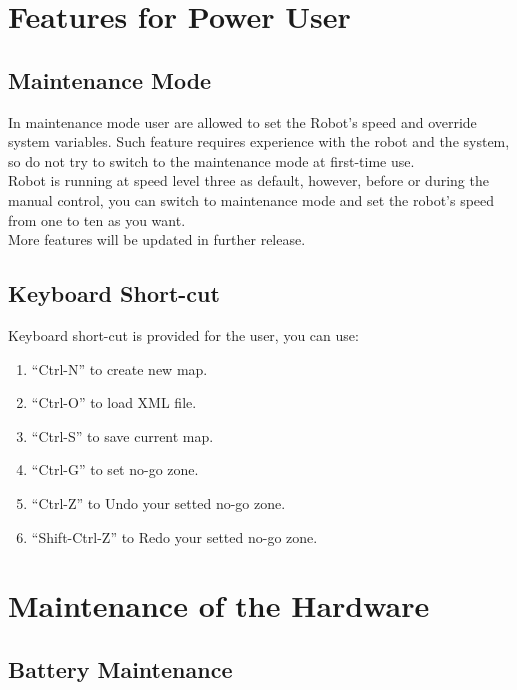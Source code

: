 \documentclass[11pt, a4paper]{report}
\begin{document}
\chapter{Features for Power User} %
\label{cha:features_for_power_user}

\section{Maintenance Mode} %
\label{sec:maintance_mode}
In maintenance mode user are allowed to set the Robot's speed and override system variables. Such feature requires experience with the robot and the system, so do not try to switch to the maintenance mode at first-time use.\\
Robot is running at speed level three as default, however, before or during the manual control, you can switch to maintenance mode and set the robot's speed from one to ten as you want.\\
More features will be updated in further release.\\

\section{Keyboard Short-cut} %
\label{sec:keyboard_short_cut}
Keyboard short-cut is provided for the user, you can use:
\begin{enumerate}
 	\item ``Ctrl-N'' to create new map.
 	\item ``Ctrl-O'' to load XML file.
 	\item ``Ctrl-S'' to save current map.
 	\item ``Ctrl-G'' to set no-go zone.
 	\item ``Ctrl-Z'' to Undo your setted no-go zone.
 	\item ``Shift-Ctrl-Z'' to Redo your setted no-go zone.
 \end{enumerate}
  







\chapter{Maintenance of the Hardware} %
\label{cha:maintenance_of_the_hardware}

\section{Battery Maintenance} %
\label{sec:battery_maintenance}
\end{document}
